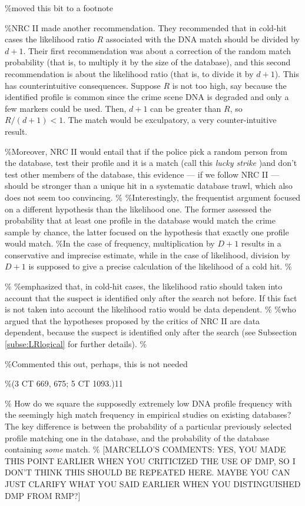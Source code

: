 \documentclass[10pt,dvipsnames,enabledeprecatedfontcommands]{scrartcl}
\begin{document}
\%moved this bit to a footnote

\%NRC II made another recommendation. They recommended that in cold-hit
cases the likelihood ratio \(R\) associated with the DNA match should be
divided by \(d+1\). Their first recommendation was about a correction of
the random match probability (that is, to multiply it by the size of the
database), and this second recommendation is about the likelihood ratio
(that is, to divide it by \(d+1\)). This has counterintuitive
consequences. Suppose \(R\) is not too high, say because the identified
profile is common since the crime scene DNA is degraded and only a few
markers could be used. Then, \(d+1\) can be greater than \(R\), so
\(R/(d+1)<1\). The match would be exculpatory, a very counter-intuitive
result.

\%Moreover, NRC II would entail that if the police pick a random person
from the database, test their profile and it is a match (call this
\emph{lucky strike} )and don't test other members of the database, this
evidence --- if we follow NRC II --- should be stronger than a unique
hit in a systematic database trawl, which also does not seem too
convincing. \% \%Interestingly, the frequentist argument focused on a
different hypothesis than the likelihood one. The former assessed the
probability that at least one profile in the database would match the
crime sample by chance, the latter focused on the hypothesis that
exactly one profile would match. \%In the case of frequency,
multiplication by \(D+1\) results in a conservative and imprecise
estimate, while in the case of likelihood, division by \(D+1\) is
supposed to give a precise calculation of the likelihood of a cold hit.
\%

\% \%emphasized that, in cold-hit cases, the likelihood ratio should
taken into account that the suspect is identified only after the search
not before. If this fact is not taken into account the likelihood ratio
would be data dependent. \% \%who argued that the hypotheses proposed by
the critics of NRC II are data dependent, because the suspect is
identified only after the search (see Subsection \ref{subse:LRlogical}
for further details). \%

\%Commented this out, perhaps, this is not needed

\%(3 CT 669, 675; 5 CT 1093.)11

\% How do we square the supposedly extremely low DNA profile frequency
with the seemingly high match frequency in empirical studies on existing
databases? The key difference is between the probability of a particular
previously selected profile matching one in the database, and the
probability of the database containing \emph{some} match. \%
{[}MARCELLO'S COMMENTS: YES, YOU MADE THIS POINT EARLIER WHEN YOU
CRITICIZED THE USE OF DMP, SO I DON'T THINK THIS SHOULD BE REPEATED
HERE. MAYBE YOU CAN JUST CLARIFY WHAT YOU SAID EARLIER WHEN YOU
DISTINGUISHED DMP FROM RMP?{]}
\end{document}
